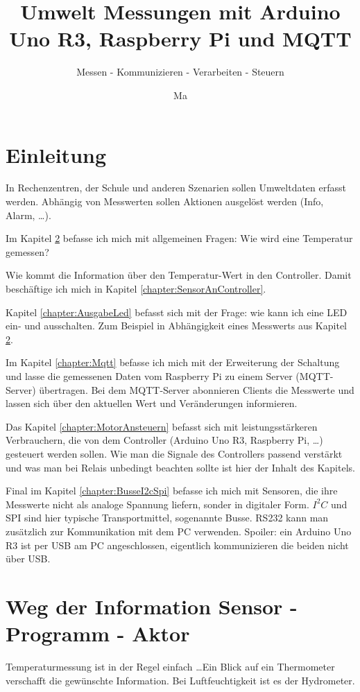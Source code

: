 \documentclass[paper = a4]{scrreprt}
\title{Umwelt Messungen mit Arduino Uno R3, Raspberry Pi und MQTT}
\subtitle{Messen - Kommunizieren - Verarbeiten - Steuern}
\author{Ma}
\begin{document}
\maketitle

\tableofcontents
\chapter{Einleitung}
In Rechenzentren, der Schule und anderen Szenarien sollen Umweltdaten erfasst werden. Abhängig von Messwerten sollen Aktionen ausgelöst werden (Info, Alarm, \dots).

Im Kapitel \ref{chapter:Sensor} befasse ich mich mit allgemeinen Fragen: Wie wird eine Temperatur gemessen?

Wie kommt die Information über den Temperatur-Wert in den Controller. Damit beschäftige ich mich in Kapitel \ref{chapter:SensorAnController}.

Kapitel \ref{chapter:AusgabeLed} befasst sich mit der Frage: wie kann ich eine LED ein- und ausschalten. Zum Beispiel in Abhängigkeit eines Messwerts aus  Kapitel \ref{chapter:Sensor}.

Im Kapitel \ref{chapter:Mqtt} befasse ich mich mit der Erweiterung der Schaltung und lasse die gemessenen Daten vom Raspberry Pi zu einem Server (MQTT-Server) übertragen. Bei dem MQTT-Server abonnieren Clients die Messwerte und lassen sich über den aktuellen Wert und Veränderungen informieren.

Das Kapitel \ref{chapter:MotorAnsteuern} befasst sich mit leistungsstärkeren Verbrauchern, die von dem Controller (Arduino Uno R3, Raspberry Pi, \dots) gesteuert werden sollen. Wie man die Signale des Controllers passend verstärkt und was man bei Relais unbedingt beachten sollte ist hier der Inhalt des Kapitels.

Final im Kapitel \ref{chapter:BusseI2cSpi} befasse ich mich mit Sensoren, die ihre Messwerte nicht als analoge Spannung liefern, sonder in digitaler Form. $I^2C$ und SPI sind hier typische Transportmittel, sogenannte Busse. RS232 kann man zusätzlich zur Kommunikation mit dem PC verwenden. Spoiler: ein Arduino Uno R3 ist per USB am PC angeschlossen, eigentlich kommunizieren die beiden nicht über USB.


\chapter{Weg der Information Sensor - Programm - Aktor}
\label{chapter:Sensor}
Temperaturmessung ist in der Regel einfach \dots Ein Blick auf ein Thermometer verschafft die gewünschte Information. Bei Luftfeuchtigkeit ist es der Hydrometer.
\end{document}
